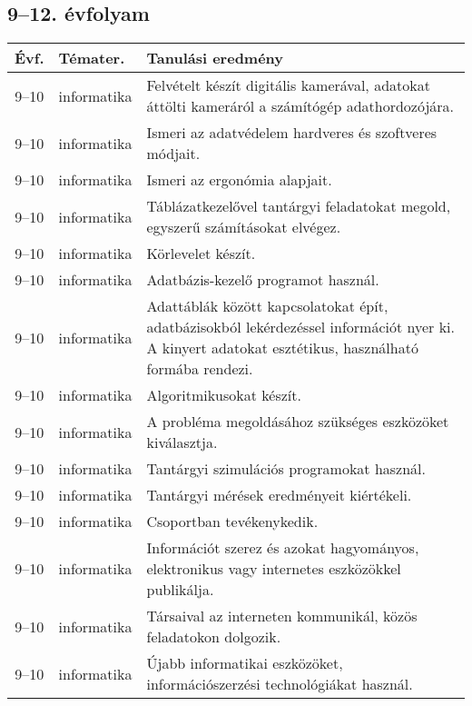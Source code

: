 \subsection{9--12. évfolyam}
\begin{small}
  \begin{longtable}{c | p{2cm} |  p{11cm} }
    \textbf{Évf.} & \textbf{Témater.} & \textbf{Tanulási eredmény} \\ \hline \hline
    \endhead

              9--10 & informatika & Felvételt készít digitális kamerával, adatokat áttölti kameráról a számítógép adathordozójára. \\ \hline
              9--10 & informatika & Ismeri az adatvédelem hardveres és szoftveres módjait. \\ \hline
              9--10 & informatika & Ismeri az ergonómia alapjait. \\ \hline
              9--10 & informatika & Táblázatkezelővel tantárgyi feladatokat megold, egyszerű számításokat elvégez. \\ \hline
              9--10 & informatika & Körlevelet készít. \\ \hline
              9--10 & informatika & Adatbázis-kezelő programot használ. \\ \hline
              9--10 & informatika & Adattáblák között kapcsolatokat épít, adatbázisokból lekérdezéssel információt nyer ki. A kinyert adatokat esztétikus, használható formába rendezi. \\ \hline
              9--10 & informatika & Algoritmikusokat készít. \\ \hline
              9--10 & informatika & A probléma megoldásához szükséges eszközöket kiválasztja. \\ \hline
              9--10 & informatika & Tantárgyi szimulációs programokat használ. \\ \hline
              9--10 & informatika & Tantárgyi mérések eredményeit kiértékeli. \\ \hline
              9--10 & informatika & Csoportban tevékenykedik. \\ \hline
              9--10 & informatika & Információt szerez és azokat hagyományos, elektronikus vagy internetes eszközökkel publikálja. \\ \hline
              9--10 & informatika & Társaival az interneten kommunikál, közös feladatokon dolgozik. \\ \hline
              9--10 & informatika & Újabb informatikai eszközöket, információszerzési technológiákat használ. \\ \hline

\end{longtable}
\end{small}
